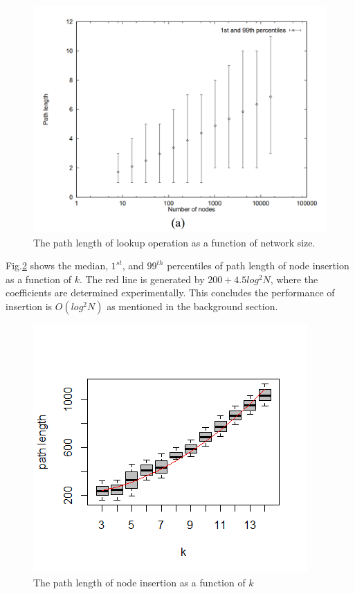 \documentclass{article}
\begin{document}
\begin{figure}[H]
\centering
\includegraphics[scale=1]{oldlookup.PNG}
\caption{The path length of lookup operation as a function of network size.
\label{oldlookup}}
\end{figure}

Fig.\ref{insert} shows the median, $1^{st}$, and $99^{th}$ percentiles of path length of node insertion as a function of $k$. The red line is generated by $200+4.5log^2N$, where the coefficients are determined experimentally. This concludes the performance of insertion is $O(log^2N)$ as mentioned in the background section. 
\begin{figure}[H]
\centering
\includegraphics[scale=1]{insertion.png}
\caption{The path length of node insertion as a function of $k$
\label{insert}}
\end{figure}







\end{document}
